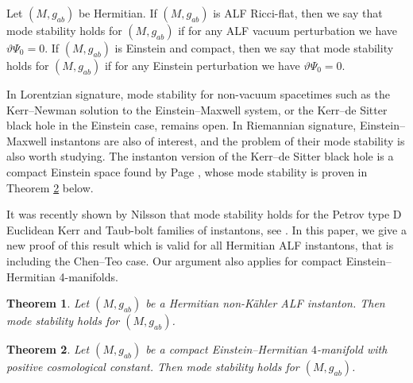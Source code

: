 \documentclass[10pt,a4paper]{amsart}
\numberwithin{equation}{section}
\newtheorem{Theorem}{Theorem}[section]
\begin{document}
\begin{Definition} \label{Def:modestability}
Let $(M, g_{ab})$ be Hermitian.
If $(M,g_{ab})$ is ALF Ricci-flat, then we say that mode stability holds for $(M, g_{ab})$ if for any ALF vacuum perturbation we have $\vartheta \Psi_0 = 0$.
If $(M,g_{ab})$ is Einstein and compact, then we say that mode stability holds for $(M, g_{ab})$ if for any Einstein perturbation we have $\vartheta \Psi_0 = 0$.
\end{Definition}

\begin{Remark}
In Lorentzian signature, mode stability for non-vacuum spacetimes such as the Kerr--Newman solution to the Einstein--Maxwell system, or the Kerr--de Sitter black hole in the Einstein case, remains open. In Riemannian signature, Einstein--Maxwell instantons are also of interest, and the problem of their mode stability is also worth studying. The instanton version of the Kerr--de Sitter black hole is a compact Einstein space found by Page \cite{Page}, whose mode stability is proven in Theorem \ref{thm:modestabCompact} below.
\end{Remark}

It was recently shown by Nilsson that mode stability holds for the Petrov type D Euclidean Kerr and Taub-bolt families of instantons, see \cite{2024CQGra..41h5004N}. In this paper, we give a new proof of this result which is valid for all Hermitian ALF instantons, that is including the Chen--Teo case.
Our argument also applies for compact Einstein--Hermitian 4-manifolds.


\begin{Theorem}
\label{thm:modestab}
Let $(M,g_{ab})$ be a Hermitian non-K\"ahler ALF instanton. Then mode stability holds for $(M,g_{ab})$.
\end{Theorem}

\begin{Theorem} \label{thm:modestabCompact}
Let $(M,g_{ab})$ be a compact Einstein--Hermitian $4$-manifold with positive cosmological constant. Then mode stability holds for $(M,g_{ab})$.
\end{Theorem}
\end{document}
